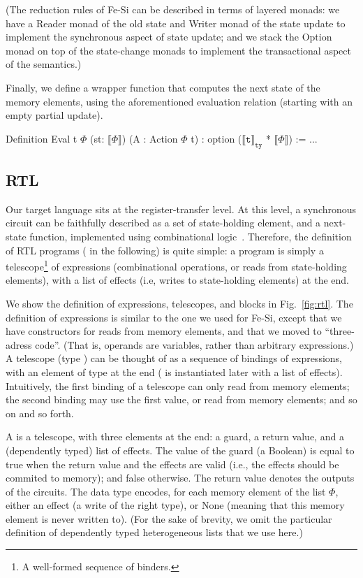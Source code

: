 \documentclass{llncs}
\newcommand{\denote}[1]{\llbracket #1 \rrbracket}
\newcommand{\denotety}[1]{\denote{\mathtt{#1}}_{\mathtt{ty}}}
\begin{document}
(The reduction rules of Fe-Si can be described in terms of layered
monads: we have a Reader monad of the old state and Writer monad of
the state update to implement the synchronous aspect of state update;
and we stack the Option monad on top of the state-change monads to
implement the transactional aspect of the semantics.)

Finally, we define a wrapper function that computes the next state of
the memory elements, using the aforementioned evaluation relation
(starting with an empty partial update). 
\begin{mcoq}
Definition Eval {t} {$\Phi$} (st: $\denote{\Phi}$) (A : Action $\Phi$ t) : option ($\denotety{t}$ * $\denote{\Phi}$) := ...
\end{mcoq}

\subsection{RTL} 
Our target language sits at the register-transfer level. At this
level, a synchronous circuit can be faithfully described as a set of
state-holding element, and a next-state function, implemented using
combinational logic~\cite{DBLP:journals/cj/Gordon02}.
%
Therefore, the definition of RTL programs ( in the
following) is quite simple: a program is simply a telescope\footnote{A
  well-formed sequence of binders.} of expressions (combinational
operations, or reads from state-holding elements), with a list of
effects (i.e, writes to state-holding elements) at the end.

We show the definition of expressions, telescopes, and blocks in
Fig.~\ref{fig:rtl}. 
%
The definition of expressions is similar to the one we used for Fe-Si,
except that we have constructors for reads from memory elements, and
that we moved to ``three-adress code''.
%
(That is, operands are variables, rather than arbitrary expressions.)
%
A telescope (type ) can be thought of as a sequence of
bindings of expressions, with an element of type  at the
end ( is instantiated later with a list of effects).
%
Intuitively, the first binding of a telescope can only read from
memory elements; the second binding may use the first value, or read
from memory elements; and so on and so forth.

A  is a telescope, with three elements at the end: a
guard, a return value, and a (dependently typed) list of effects. 
%
The value of the guard (a Boolean) is equal to true when the
return value and the effects are valid (i.e., the effects should be
commited to memory); and false otherwise.
%
The return value denotes the outputs of the circuits. 
%
The data type  encodes, for each memory element of the
list $\Phi$, either an effect (a write of the right type), or None
(meaning that this memory element is never written to). (For the sake
of brevity, we omit the particular definition of dependently typed
heterogeneous lists  that we use here.)
\end{document}
